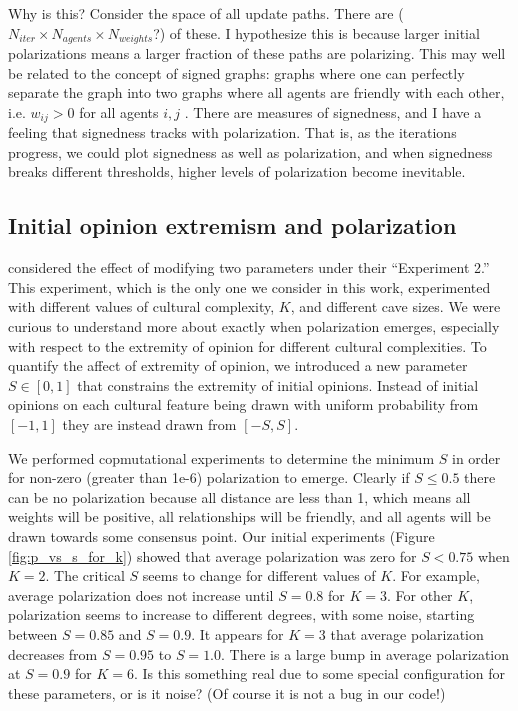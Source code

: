 \documentclass[11pt,letterpaper]{article}
\begin{document}
Why is this? Consider the space of all update paths. 
There are ($N_{iter} \times N_{agents} \times N_{weights}$?) of these.
I hypothesize this is because larger initial polarizations means a larger
fraction of these paths are polarizing. This may well be related to the 
concept of signed graphs: graphs where one can perfectly separate the graph
into two graphs where all agents are friendly with each other, i.e. 
$w_{ij} > 0$ for all agents $i,j$ \cite{Altafini2012}. There are measures of
signedness, and I have a feeling that signedness tracks with polarization.
That is, as the iterations progress, we could plot signedness as well as 
polarization, and when signedness breaks different thresholds, higher levels of
polarization become inevitable.


\subsection{Initial opinion extremism and polarization}

 considered the effect of modifying two parameters under their
``Experiment 2.'' This experiment, which is the only one we consider in this
work, experimented with different values of cultural complexity, $K$, and 
different cave sizes. We were curious to understand more about exactly when
polarization emerges, especially with respect to the extremity of opinion
for different cultural complexities. To quantify the affect of extremity of
opinion, we introduced a new parameter $S \in [0, 1]$ that constrains the
extremity of initial opinions. Instead of initial opinions on each
cultural feature being drawn with uniform probability from $[-1, 1]$ they are
instead drawn from $[-S, S]$. 

We performed copmutational experiments to determine the minimum $S$ 
in order for non-zero (greater than 1e-6) polarization to emerge. Clearly if 
$S\leq0.5$ there can be no polarization because all distance are less than 1,
which means all weights will be positive, all
relationships will be friendly, and all agents will be drawn towards some 
consensus point. Our initial experiments (Figure \ref{fig:p_vs_s_for_k})
showed that average polarization was zero for $S < 0.75$ when $K=2$. 
The critical $S$ seems to change for different values of $K$. For example,
average polarization does not increase until $S=0.8$ for $K=3$. For other $K$,
polarization seems to increase to different degrees, with some noise, starting
between $S=0.85$ and $S=0.9$. It appears for $K=3$ that average polarization
decreases from $S=0.95$ to $S=1.0$. There is a large bump in average 
polarization at $S=0.9$ for $K=6$. Is this something real due to some special
configuration for these parameters, or is it noise? (Of course it is not a bug
in our code!)
\end{document}
